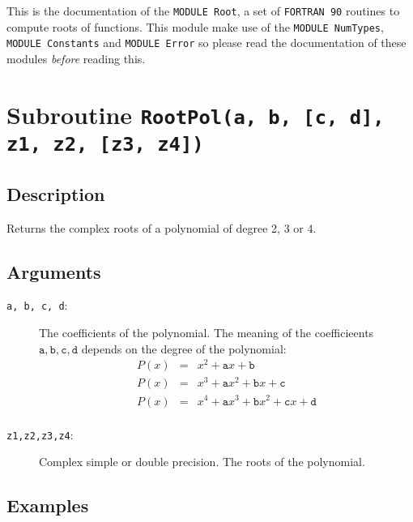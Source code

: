 This is the documentation of the \texttt{MODULE Root}, a set
of \texttt{FORTRAN 90} routines to compute roots of functions. This
module make use of the \texttt{MODULE NumTypes}, \texttt{MODULE
  Constants} and \texttt{MODULE Error} so please read the
documentation of these modules \emph{before} reading this. 


\section{Subroutine \texttt{RootPol(a, b, [c, d], z1, z2, [z3, z4])}}

\subsection{Description}

Returns the complex roots of a polynomial of degree 2, 3 or 4. 

\subsection{Arguments}

\begin{description}
\item[\texttt{a, b, c, d}:] The coefficients of the polynomial. The
  meaning of the coefficieents $\mathtt{a,b,c,d}$ depends on the
  degree of the polynomial:
  \begin{eqnarray*}
    P(x) &=& x^2 + \mathtt{a}x + \mathtt{b} \\
    P(x) &=& x^3 + \mathtt{a}x^2 + \mathtt{b}x + \mathtt{c}\\
    P(x) &=& x^4 + \mathtt{a}x^3 + \mathtt{b}x^2 + \mathtt{c}x + \mathtt{d}\\
  \end{eqnarray*}
\item[\texttt{z1,z2,z3,z4}:] Complex simple or double precision. The
  roots of the polynomial.
\end{description}

\subsection{Examples}

